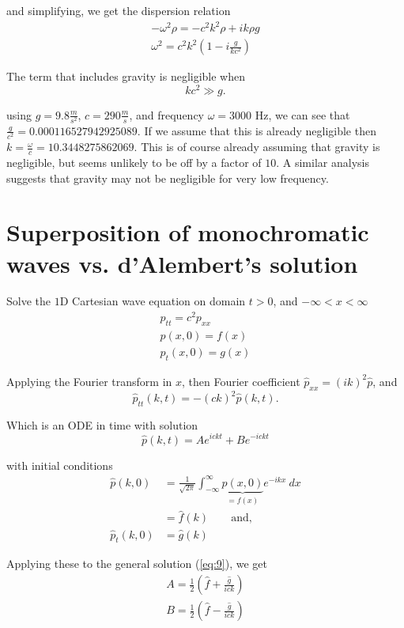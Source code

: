 and simplifying, we get the dispersion relation
\begin{gather}
  -\omega ^{2}\rho = -c^{2}k^{2}\rho + ik\rho g \nonumber \\
  \boxed{\omega^{2} = c^2 k^2 \left(1-i \frac{g}{kc^2}\right)} \label{eq:8}
\end{gather}


The term that includes gravity is negligible when 
\[
kc^2\gg g
.\] 

using $g = 9.8\frac{m}{s^2}$, $c=290
\frac{m}{s}$, and frequency $\omega = 3000$ Hz, we can see that $\frac{g}{c^2}
= 0.000116527942925089$. If we assume that this is already negligible then $k=
\frac{\omega}{c} = 10.3448275862069$. This is of course already assuming that
gravity is negligible, but seems unlikely to be off by a factor of $10$.
A similar analysis suggests that gravity may not be negligible for very low
frequency.

\section{Superposition of monochromatic waves vs. d'Alembert's solution}%
\label{sec:2}

Solve the $1$D Cartesian wave equation on domain $t>0$, and $-\infty<x<\infty$
\begin{gather*}
    p_{tt} = c^2p_{xx} \\
    p(x,0) = f(x) \\
    p_{t}(x,0) = g(x)
\end{gather*}

Applying the Fourier transform in $x$, then Fourier coefficient $\hat{p}_{xx}=
(ik)^2\hat{p}$, and
\[
  \hat{p}_{tt}(k,t) = - (ck)^2\hat{p}(k,t)
.\] 

Which is an ODE in time with solution
\begin{equation}
  \hat{p}(k,t) = Ae^{ickt}+Be^{-ickt} \label{eq:9}
\end{equation}

with initial conditions
\begin{align*}
  \hat{p}(k,0) &= \frac{1}{\sqrt{2\pi}} \int_{-\infty }^{\infty
  } { \underbrace{p(x,0)}_{=f(x)}e^{-ikx}} \: d{x} \\
  &= \hat{f}(k) \qquad \text{and, }\\
  \hat{p}_{t}(k,0) &= \hat{g}(k)
\end{align*}

Applying these to the general solution (\ref{eq:9}), we get
  \begin{gather*}
    A = \frac{1}{2} \left(\hat{f}+ \frac{\hat{g}}{ick}\right) \\
    B = \frac{1}{2} \left(\hat{f}- \frac{\hat{g}}{ick}\right) \\
  \end{gather*}

